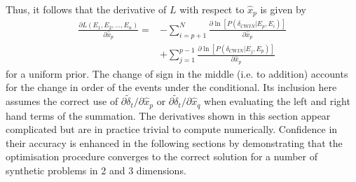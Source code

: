 \documentclass[extra]{gji}
\begin{document}
Thus, it follows that the derivative of $L$ with respect to $\hat{x}_p$ is given by
\begin{equation}
\label{eq-derivative-Lstar-cwionly}
\begin{array}{ll}
\frac{\partial L(E_1, E_2, ..., E_n)}{\partial \hat{x}_p} = &
- \sum_{i=p+1}^{N} \frac{ \partial \ln \left[P(\delta_{CWIN}|E_p,E_i)\right]}{\partial \hat{x}_p} \\
 & + \sum_{j=1}^{p-1} \frac{ \partial \ln \left[P(\delta_{CWIN}|E_j,E_p)\right]}{\partial \hat{x}_p}
\end{array}
\end{equation}
%
for a uniform prior. The change of sign in the middle (i.e. to addition) accounts for the change in
order of the events under the conditional. Its inclusion here assumes the correct use of
$\partial \widetilde{\delta}_t / \partial \hat{x}_p$
or
$\partial \widetilde{\delta}_t / \partial \hat{x}_q$
when evaluating the left and right hand terms of the summation. The derivatives shown in this section
appear complicated but are in practice trivial to compute numerically.
Confidence in their accuracy is enhanced in the following sections by demonstrating that
the optimisation procedure converges to the correct solution for a number of synthetic problems
in 2 and 3 dimensions.


\clearpage
\end{document}
